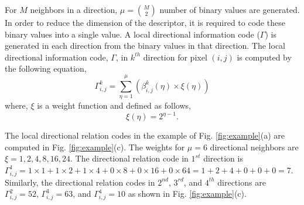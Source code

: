 \documentclass[a4paper]{article}
\begin{document}
For $M$ neighbors in a direction, $\mu=\binom{M}{2}$ number of binary values are generated. In order to reduce the dimension of the descriptor, it is required to code these binary values into a single value. A local directional information code ($\Gamma$) is generated in each direction from the binary values in that direction. The local directional information code, $\Gamma$, in $k^{th}$ direction for pixel $(i,j)$ is computed by the following equation, 
\begin{equation}
\Gamma_{i,j}^{k} = \sum_{\eta=1}^{\mu}(\beta_{i,j}^{k}(\eta) \times \xi(\eta))
\end{equation}
where, $\xi$ is a weight function and defined as follows,
\begin{equation}
\xi(\eta)=2^{\eta-1}.
\label{weight}
\end{equation}

The local directional relation codes in the example of Fig. \ref{fig:example}(a) are computed in Fig. \ref{fig:example}(c). The weights for $\mu=6$ directional neighbors are $\xi=1,2,4,8,16,24$. The directional relation code in $1^{st}$ direction is $\Gamma_{i,j}^{1}=1\times1+1\times2+1\times4+0\times8+0\times16+0\times64=1+2+4+0+0+0=7$. Similarly, the directional relation codes in $2^{nd}$, $3^{rd}$, and $4^{th}$ directions are $\Gamma_{i,j}^{2}=52$, $\Gamma_{i,j}^{3}=63$, and $\Gamma_{i,j}^{4}=10$ as shown in Fig. \ref{fig:example}(c).
\end{document}

